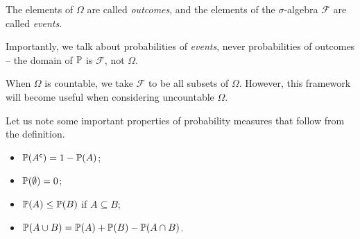 \documentclass{../../template/note}
\begin{document}
    \begin{definition}
        The elements of \(\Omega\) are called \emph{outcomes}, and the elements of the \(\sigma\)-algebra \(\mathcal F\) are called \emph{events}.
    \end{definition}
    
    Importantly, we talk about probabilities of \emph{events}, never probabilities of outcomes -- the domain of \(\mathbb P\) is \(\mathcal F\), not \(\Omega\).

    \begin{remark*}
        When \(\Omega\) is countable, we take \(\mathcal F\) to be all subsets of \(\Omega\). However, this framework will become useful when considering uncountable \(\Omega\).
    \end{remark*}
    
    Let us note some important properties of probability measures that follow from the definition.

    \begin{itemize}
        \item \(\mathbb P(A^{\mathsf{c}}) = 1 - \mathbb P(A)\);
        \item \(\mathbb P(\emptyset) = 0\);
        \item \(\mathbb P(A) \leq \mathbb P(B)\) if \(A \subseteq B\);
        \item \(\mathbb P(A \cup B) = \mathbb P(A) + \mathbb P(B) - \mathbb P(A \cap B)\).
    \end{itemize}
    
\end{document}
